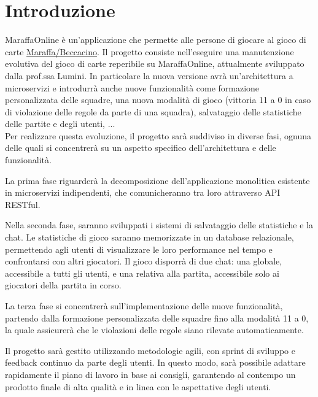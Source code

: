 \chapter{Introduzione}
\label{ch:into} %
MaraffaOnline è un'applicazione che permette alle persone di giocare al gioco di carte \href{https://it.wikipedia.org/wiki/Marafone_Beccacino}{Maraffa/Beccacino}. 
Il progetto consiste nell’eseguire una manutenzione evolutiva del gioco di carte reperibile su MaraffaOnline, attualmente sviluppato dalla prof.ssa Lumini.
In particolare la nuova versione avrà un'architettura a microservizi e introdurrà anche nuove funzionalità come formazione personalizzata delle squadre, una nuova modalità 
di gioco (vittoria 11 a 0 in caso di violazione delle regole da parte di una squadra), salvataggio delle statistiche delle partite e degli utenti, ...
\\
Per realizzare questa evoluzione, il progetto sarà suddiviso in diverse fasi, ognuna delle quali si concentrerà su un aspetto specifico dell'architettura
e delle funzionalità. 

La prima fase riguarderà la decomposizione dell'applicazione monolitica esistente in microservizi indipendenti, che comunicheranno
tra loro attraverso API RESTful. 

Nella seconda fase, saranno sviluppati i sistemi di salvataggio delle statistiche e la chat. Le statistiche di gioco saranno memorizzate in un database relazionale,
permettendo agli utenti di visualizzare le loro performance nel tempo e confrontarsi con altri giocatori.
Il gioco disporrà di due chat: una globale, accessibile a tutti gli utenti, e una relativa alla partita, accessibile solo ai giocatori della partita in corso.

La terza fase si concentrerà sull'implementazione delle nuove funzionalità, partendo dalla formazione personalizzata delle squadre fino alla modalità 11 a 0, la quale assicurerà
che le violazioni delle regole siano rilevate automaticamente.

Il progetto sarà gestito utilizzando metodologie agili, con sprint di sviluppo e feedback continuo da parte degli utenti.
In questo modo, sarà possibile adattare rapidamente il piano di lavoro in base ai consigli,
garantendo al contempo un prodotto finale di alta qualità e in linea con le aspettative degli utenti.
